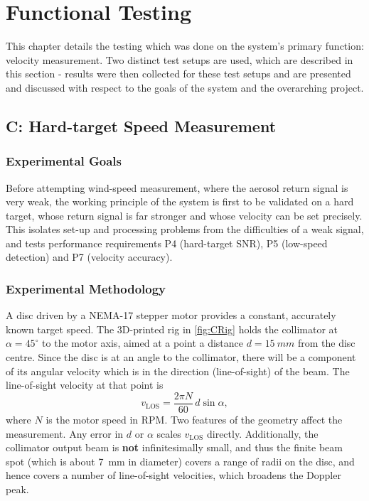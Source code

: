 \chapter{Functional Testing}
\label{sec:functionalTesting}
This chapter details the testing which was done on the system's primary function: velocity measurement. Two distinct test setups are used, which are described in this section - results were then collected for these test setups and are presented and discussed with respect to the goals of the system and the overarching project. 

\section{C: Hard-target Speed Measurement}
\label{sec:hardTargetTesting}
\subsection{Experimental Goals}
Before attempting wind-speed measurement, where the aerosol return signal is very weak, the working principle of the system is first to be validated on a hard target, whose return signal is far stronger and whose velocity can be set precisely. This isolates set-up and processing problems from the difficulties of a weak signal, and tests performance requirements P4 (hard-target SNR),
P5 (low-speed detection) and P7 (velocity accuracy).

\subsection{Experimental Methodology}
A disc driven by a NEMA-17 stepper motor provides a constant, accurately known target speed.
The 3D-printed rig in \autoref{fig:CRig} holds the collimator at $\alpha = 45^\circ$ to the
motor axis, aimed at a point a distance $d = \SI{15}{mm}$ from the disc centre. Since the disc is at an angle to the collimator, there will be a component of its angular velocity which is in the direction (line-of-sight) of the beam. The
line-of-sight velocity at that point is
\begin{equation}
	v_{\mathrm{LOS}} = \frac{2\pi N}{60}\, d \sin\alpha ,
	\label{eq:vlos_rig}
\end{equation}
where $N$ is the motor speed in RPM. Two features of the geometry affect the measurement.
Any error in $d$ or $\alpha$ scales $v_{\mathrm{LOS}}$ directly. Additionally, the collimator output beam is \textbf{not} infinitesimally small, and thus the finite beam spot
(which is about \SI{7}{mm} in diameter) covers a range of radii on the disc, and hence covers a number of line-of-sight
velocities, which broadens the Doppler peak.

